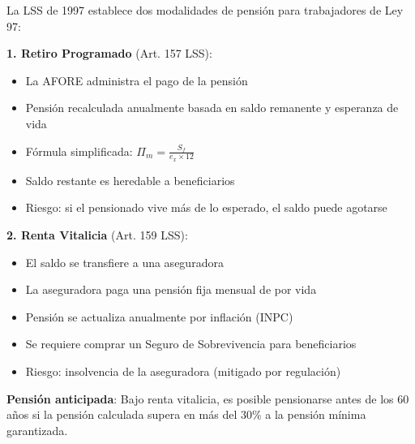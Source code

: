 \documentclass[11pt,a4paper]{report}
\begin{document}
\begin{tcolorbox}[colback=blue!5!white, colframe=blue!75!black, title=\textbf{Definici\'on Formal}]
La LSS de 1997 establece dos modalidades de pensi\'on para trabajadores de Ley 97:

\textbf{1. Retiro Programado} (Art. 157 LSS):
\begin{itemize}[nosep]
\item La AFORE administra el pago de la pensi\'on
\item Pensi\'on recalculada anualmente basada en saldo remanente y esperanza de vida
\item F\'ormula simplificada: $\Pi_m = \frac{S_f}{e_x \times 12}$
\item Saldo restante es heredable a beneficiarios
\item Riesgo: si el pensionado vive m\'as de lo esperado, el saldo puede agotarse
\end{itemize}

\textbf{2. Renta Vitalicia} (Art. 159 LSS):
\begin{itemize}[nosep]
\item El saldo se transfiere a una aseguradora
\item La aseguradora paga una pensi\'on fija mensual de por vida
\item Pensi\'on se actualiza anualmente por inflaci\'on (INPC)
\item Se requiere comprar un Seguro de Sobrevivencia para beneficiarios
\item Riesgo: insolvencia de la aseguradora (mitigado por regulaci\'on)
\end{itemize}

\textbf{Pensi\'on anticipada}: Bajo renta vitalicia, es posible pensionarse antes de los 60 a\~nos si la pensi\'on calculada supera en m\'as del 30\% a la pensi\'on m\'inima garantizada.
\end{tcolorbox}
\end{document}
